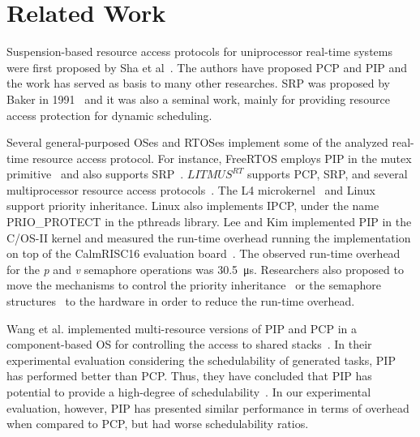 \section{Related Work}
\label{sec:rel}

Suspension-based resource access protocols for uniprocessor real-time systems 
were first proposed by Sha et al~\cite{Sha:1990}. The authors have proposed PCP 
and PIP and the work has served as basis to many other researches. SRP was 
proposed by Baker in 1991~\cite{Baker:1991} and it was also a seminal work, 
mainly for providing resource access protection for dynamic scheduling. 

Several general-purposed OSes and RTOSes implement some of the 
analyzed real-time resource access protocol. For instance, FreeRTOS employs 
PIP in the mutex primitive~\cite{freertos} and also supports 
SRP~\cite{Inam:2011}. $LITMUS^{RT}$ supports PCP, SRP, and several 
multiprocessor resource access protocols~\cite{Brandenburg:2008,Spliet:2014}. 
The L4 microkernel~\cite{Liedtke:1995} and Linux support priority inheritance. 
Linux also implements IPCP, under the name PRIO\_PROTECT in the pthreads 
library. Lee and Kim implemented PIP in the \si{\micro}C/OS-II 
kernel and measured the run-time overhead running the 
implementation on top of the CalmRISC16 evaluation board~\cite{Lee:2003}. The 
observed run-time overhead for the \emph{p} and \emph{v} semaphore operations 
was 30.5~\si{\micro\second}. Researchers also proposed to move the mechanisms 
to control the priority inheritance~\cite{Akgul:2003} or the semaphore 
structures~\cite{Marcondes:2009} to the hardware in order to reduce the run-time 
overhead.

Wang et al. implemented multi-resource versions of PIP and PCP 
in a component-based OS for controlling the access to shared 
stacks~\cite{Wang:2011}. In their experimental evaluation considering the 
schedulability of generated tasks, PIP has performed better than PCP. Thus, 
they have concluded that PIP has potential to provide a high-degree of 
schedulability~\cite{Wang:2011}. In our experimental evaluation, however, PIP 
has presented similar performance in terms of overhead when compared to PCP, but 
had worse schedulability ratios.

